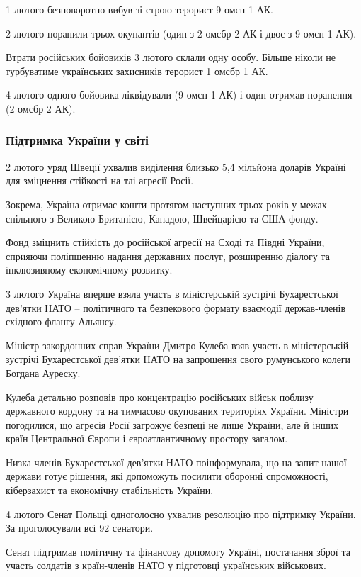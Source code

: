 1 лютого безповоротно вибув зі строю терорист 9 омсп 1 АК.

2 лютого поранили трьох окупантів (один з 2 омсбр 2 АК і двоє з 9 омсп 1 АК).

Втрати російських бойовиків 3 лютого склали одну особу. Більше ніколи не
турбуватиме українських захисників терорист 1 омсбр 1 АК.

4 лютого одного бойовика ліквідували  (9 омсп 1 АК) і один отримав поранення (2
омсбр 2 АК).

\subsubsection{Підтримка України у світі}

2 лютого уряд Швеції ухвалив виділення близько 5,4 мільйона доларів Україні для
зміцнення стійкості на тлі агресії Росії.

Зокрема, Україна отримає кошти протягом наступних трьох років у межах спільного
з Великою Британією, Канадою, Швейцарією та США фонду.

Фонд зміцнить стійкість до російської агресії на Сході та Півдні України,
сприяючи поліпшенню надання державних послуг, розширенню діалогу та
інклюзивному економічному розвитку.

3 лютого Україна вперше взяла участь в міністерській зустрічі Бухарестської
дев'ятки НАТО – політичного та безпекового формату взаємодії держав-членів
східного флангу Альянсу.

Міністр закордонних справ України Дмитро Кулеба взяв участь в міністерській
зустрічі Бухарестської дев’ятки НАТО на запрошення свого румунського колеги
Богдана Ауреску.

Кулеба детально розповів про концентрацію російських військ поблизу державного
кордону та на тимчасово окупованих територіях України. Міністри погодилися, що
агресія Росії загрожує безпеці не лише України, але й інших країн Центральної
Європи і євроатлантичному простору загалом.

Низка членів Бухарестської дев’ятки НАТО поінформувала, що на запит нашої
держави готує рішення, які допоможуть посилити оборонні спроможності,
кіберзахист та економічну стабільність України.

4 лютого Сенат Польщі одноголосно ухвалив резолюцію про підтримку України. За
проголосували всі 92 сенатори.

Сенат підтримав політичну та фінансову допомогу Україні, постачання зброї та
участь солдатів з країн-членів НАТО у підготовці українських військових.


